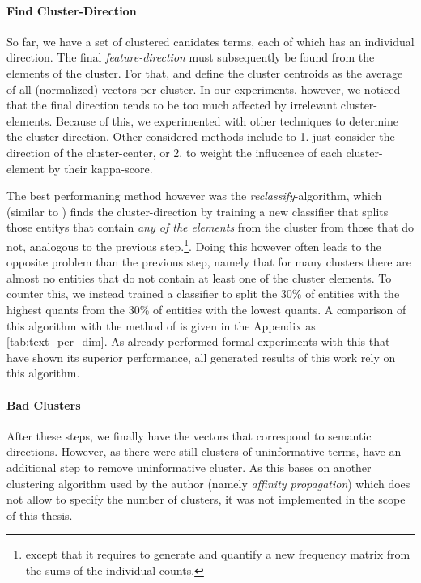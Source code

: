 \paragraph{Find Cluster-Direction}

So far, we have a set of clustered canidates terms, each of which has an individual direction. The final \textit{feature-direction} must subsequently be found from the elements of the cluster. For that, \cite{Derrac2015} and \cite{Ager2018} define the cluster centroids as the average of all (normalized) vectors per cluster. In our experiments, however, we noticed that the final direction tends to be too much affected by irrelevant cluster-elements. Because of this, we experimented with other techniques to determine the cluster direction. Other considered methods include \eg to 1. just consider the direction of the cluster-center, or 2. to weight the influcence of each cluster-element by their kappa-score.

The best performaning method however was the \textit{reclassify}-algorithm, which (similar to \cite{Alshaikh2020}) finds the cluster-direction by training a new classifier that splits those \glspl{entity} that contain \textit{any of the elements} from the cluster from those that do not, analogous to the previous step.\footnote{except that it requires to generate and quantify a new frequency matrix from the sums of the individual counts.}. Doing this however often leads to the opposite problem than the previous step, namely that for many clusters there are almost no entities that do not contain at least one of the cluster elements. To counter this, we instead trained a classifier to split the 30\% of entities with the highest \glspl{quant} from the 30\% of entities with the lowest \glspl{quant}. A comparison of this algorithm with the method of \cite{Derrac2015} is given in the Appendix as \autoref{tab:text_per_dim}. As \cite{Alshaikh2020} already performed formal experiments with this that have shown its superior performance, all generated results of this work rely on this algorithm. 

\paragraph{Bad Clusters}

After these steps, we finally have the vectors that correspond to semantic directions. However, as there were still clusters of uninformative terms, \textcite{Alshaikh2020} have an additional step to remove uninformative cluster. As this bases on another clustering algorithm used by the author (namely \textit{affinity propagation}) which does not allow to specify the number of clusters, it was not implemented in the scope of this thesis.

